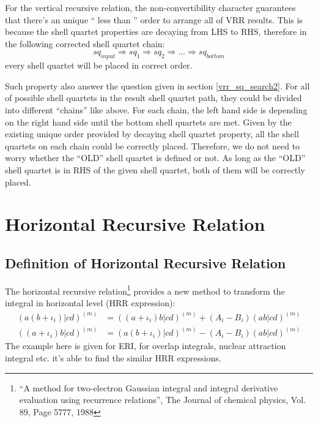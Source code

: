 For the vertical recursive relation, the non-convertibility character
guarantees that there's an unique `` less than '' order to arrange
all of VRR results. This is because the shell quartet properties 
are decaying from LHS to RHS, therefore in the following corrected 
shell quartet chain:
\begin{equation}
 sq_{input} \Rightarrow sq_{1} \Rightarrow sq_{2} \Rightarrow \dots
 \Rightarrow sq_{bottom}
\end{equation}
every shell quartet will be placed in correct order.

Such property also answer the question given in section \ref{vrr_sq_search2}.
For all of possible shell quartets in the result shell quartet path,
they could be divided into different ``chains'' like above. For 
each chain, the left hand side is depending on the right hand side 
until the bottom shell quartets are met. Given by the existing 
unique order provided by decaying shell quartet property, all 
the shell quartets on each chain could be correctly placed. Therefore,
we do not need to worry whether the ``OLD'' shell quartet is defined 
or not. As long as the ``OLD'' shell quartet is in RHS of the given
shell quartet, both of them will be correctly placed.

\section{Horizontal Recursive Relation}
%
%
\subsection{Definition of Horizontal Recursive Relation}
%
%
\label{hrr}

The horizontal recursive relation\footnote{``A method for two-electron Gaussian 
integral and integral derivative evaluation using recurrence relations'', 
The Journal of chemical physics, Vol. 89, Page 5777, 1988} provides a new method 
to transform the integral in horizontal level (HRR expression):
\begin{align}
\label{HRR_expression}
 (a(b+\iota_{i})|cd)^{(m)} &= ((a+\iota_{i})b|cd)^{(m)} + 
(A_{i} - B_{i})(ab|cd)^{(m)} \nonumber \\
 ((a+\iota_{i})b|cd)^{(m)} &= (a(b+\iota_{i})|cd)^{(m)} - 
(A_{i} - B_{i})(ab|cd)^{(m)}
\end{align}
The example here is given for ERI, for overlap integrals, nuclear attraction
integral etc. it's able to find the similar HRR expressions. 

